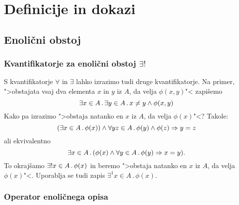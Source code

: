 \chapter{Definicije in dokazi}

\section{Enolični obstoj}

\subsection{Kvantifikatorje za enolični obstoj $\exists!$}
\label{sec:enolicni-obstoj}

S kvantifikatorje $\forall$ in $\exists$ lahko izrazimo tudi druge kvantifikatorje.
Na primer, ">obstajata vsaj dva elementa $x$ in $y$ iz $A$, da velja $\phi(x,y)$"< zapišemo
%
\begin{equation*}
    \exists x \in A \,.\, \exists y \in A \,.\, x \neq y \land \phi(x,y)
\end{equation*}
%
Kako pa izrazimo ">obstaja natanko en $x$ iz $A$, da velja $\phi(x)$"<? Takole:
%
\begin{equation*}
  (\exists x \in A \,.\, \phi(x)) \land \forall y z \in A \,.\, \phi(y) \land \phi(z) \Rightarrow y = z
\end{equation*}
%
ali ekvivalentno
%
\begin{equation*}
    \exists x \in A \,.\, (\phi(x) \land \forall y \in A \,.\, \phi(y) \Rightarrow x = y).
\end{equation*}
%
To okrajšamo $\exists! x \in A \,.\, \phi(x)$ in beremo ">obstaja natanko en $x$ iz $A$, da velja $\phi(x)$"<.
%
Uporablja se tudi zapis $\exists^1 x \in A \,.\, \phi(x)$.

\subsection{Operator enoličnega opisa}

